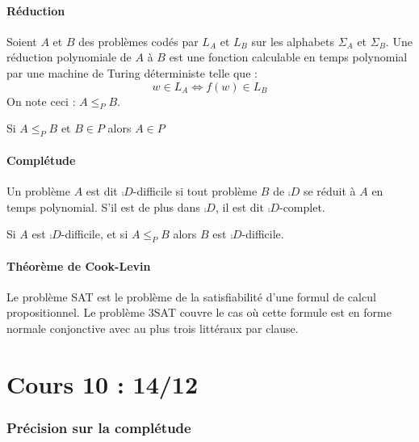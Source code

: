 \documentclass{cours}
\begin{document}
\subsection{Réduction}
\begin{definition}
    Soient $A$ et $B$ des problèmes codés par $L_{A}$ et $L_{B}$ sur les alphabets $\Sigma_{A}$ et $\Sigma_{B}$. Une réduction polynomiale de $A$ à $B$ est une fonction calculable en temps polynomial par une machine de Turing déterministe telle que : 
    \[
        w \in L_{A} \Leftrightarrow f(w) \in L_{B}
    \]
    On note ceci : $A \leq_{P} B$.
\end{definition}

\begin{proposition}
    Si $A \leq_{P} B$ et $B \in P$ alors $A\in P$ 
\end{proposition}

\subsection{Complétude}
\begin{definition}
    Un problème $A$ est dit $\comp{D}$-difficile si tout problème $B$ de $\comp{D}$ se réduit à $A$ en temps polynomial. S'il est de plus dans $\comp{D}$, il est dit $\comp{D}$-complet.
\end{definition}

\begin{proposition}
    Si $A$ est $\comp{D}$-difficile, et si $A \leq_{P} B$ alors $B$ est $\comp{D}$-difficile. 
\end{proposition}


\subsection{Théorème de Cook-Levin}
\begin{definition}
    Le problème SAT est le problème de la satisfiabilité d'une formul de calcul propositionnel. Le problème 3SAT couvre le cas où cette formule est en forme normale conjonctive avec au plus trois littéraux par clause. 
\end{definition}

\part[Précisions sur la Complétude]{Cours 10 : 14/12}
\section{Précision sur la complétude}
\end{document}
